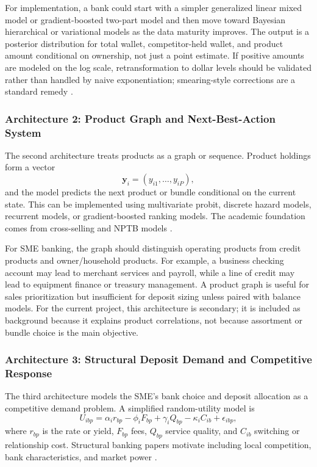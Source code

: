 \documentclass[11pt]{article}
\begin{document}
For implementation, a bank could start with a simpler generalized linear mixed
model or gradient-boosted two-part model and then move toward Bayesian
hierarchical or variational models as the data maturity improves. The output is
a posterior distribution for total wallet, competitor-held wallet, and product
amount conditional on ownership, not just a point estimate. If positive amounts
are modeled on the log scale, retransformation to dollar levels should be
validated rather than handled by naive exponentiation; smearing-style
corrections are a standard remedy \citep{duan1983smearing}.

\subsubsection*{Architecture 2: Product Graph and Next-Best-Action System}

The second architecture treats products as a graph or sequence. Product holdings
form a vector
\[
  \mathbf{y}_i = (y_{i1},\ldots,y_{iP}),
\]
and the model predicts the next product or bundle conditional on the current
state. This can be implemented using multivariate probit, discrete hazard
models, recurrent models, or gradient-boosted ranking models. The academic
foundation comes from cross-selling and NPTB models
\citep{knott2002nptb,li2005sequential}.

For SME banking, the graph should distinguish operating products from credit
products and owner/household products. For example, a business checking account
may lead to merchant services and payroll, while a line of credit may lead to
equipment finance or treasury management. A product graph is useful for sales
prioritization but insufficient for deposit sizing unless paired with balance
models. For the current project, this architecture is secondary; it is included
as background because it explains product correlations, not because assortment
or bundle choice is the main objective.

\subsubsection*{Architecture 3: Structural Deposit Demand and Competitive Response}

The third architecture models the SME's bank choice and deposit allocation as a
competitive demand problem. A simplified random-utility model is
\[
  U_{ibp} =
  \alpha_i r_{bp}
  - \phi_i F_{bp}
  + \gamma_i Q_{bp}
  - \kappa_i C_{ib}
  + \epsilon_{ibp},
\]
where $r_{bp}$ is the rate or yield, $F_{bp}$ fees, $Q_{bp}$ service quality,
and $C_{ib}$ switching or relationship cost. Structural banking papers motivate
including local competition, bank characteristics, and market power
\citep{dick2008demand,adams2007who,egan2017deposit,drechsler2017deposits}.
\end{document}
